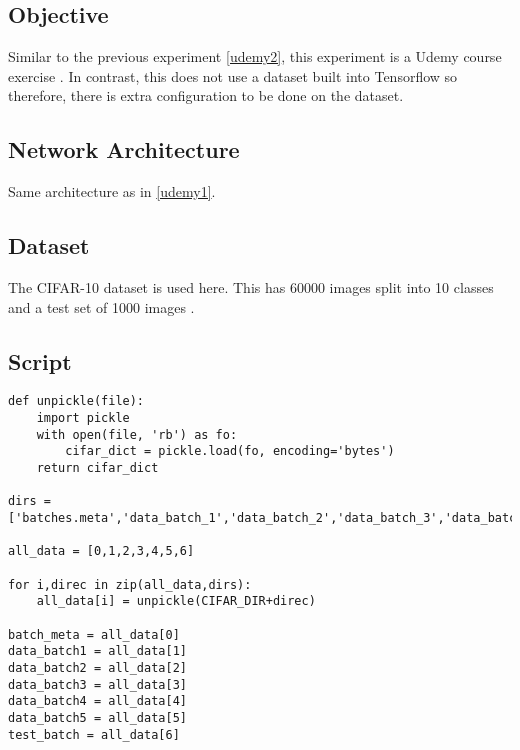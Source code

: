 \subsection*{Objective}
Similar to the previous experiment \ref{udemy2}, this experiment is a Udemy course exercise \parencite{udemy}. In contrast, this does not use a dataset built into Tensorflow so therefore, there is extra configuration to be done on the dataset.

\subsection*{Network Architecture}
Same architecture as in \ref{udemy1}.

\subsection*{Dataset}
The CIFAR-10 dataset is used here. 
This has 60000 images split into 10 classes and a test set of 1000 images \parencite{cifar}.

\subsection*{Script}
\begin{lstlisting}[style=Python]
def unpickle(file):
    import pickle
    with open(file, 'rb') as fo:
        cifar_dict = pickle.load(fo, encoding='bytes')
    return cifar_dict

dirs = ['batches.meta','data_batch_1','data_batch_2','data_batch_3','data_batch_4','data_batch_5','test_batch']

all_data = [0,1,2,3,4,5,6]

for i,direc in zip(all_data,dirs):
    all_data[i] = unpickle(CIFAR_DIR+direc)

batch_meta = all_data[0]
data_batch1 = all_data[1]
data_batch2 = all_data[2]
data_batch3 = all_data[3]
data_batch4 = all_data[4]
data_batch5 = all_data[5]
test_batch = all_data[6]
\end{lstlisting}

